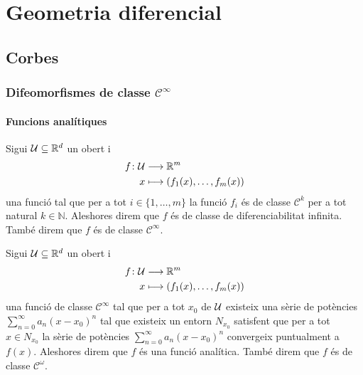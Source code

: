 \documentclass[../Apunts.tex]{subfiles}
\begin{document}
\part{Geometria diferencial}
\chapter{Corbes}
	\section{Difeomorfismes de classe \ensuremath{\mathcal{C}^{\infty}}}
	\subsection{Funcions analítiques}
	\begin{definition}
		\label{def:classe de diferenciabilitat infinita}
		Sigui \(\mathcal{U}\subseteq\mathbb{R}^{d}\) un obert i
		\begin{align*}
			f\colon\mathcal{U}&\longrightarrow\mathbb{R}^{m} \\
			x&\longmapsto(f_{1}(x),\dots,f_{m}(x))
		\end{align*}
		una funció tal que per a tot \(i\in\{1,\dots,m\}\) la funció \(f_{i}\) és de classe \(\mathcal{C}^{k}\) per a tot natural \(k\in\mathbb{N}\). Aleshores direm que \(f\) és de classe de diferenciabilitat infinita. També direm que \(f\) és de classe \(\mathcal{C}^{\infty}\).
	\end{definition}
	\begin{definition}
		\label{def:funció analítica}
		Sigui \(\mathcal{U}\subseteq\mathbb{R}^{d}\) un obert i
		\begin{align*}
			f\colon\mathcal{U}&\longrightarrow\mathbb{R}^{m} \\
			x&\longmapsto(f_{1}(x),\dots,f_{m}(x))
		\end{align*}
		una funció de classe \(\mathcal{C}^{\infty}\) tal que per a tot \(x_{0}\) de \(\mathcal{U}\) existeix una sèrie de potències \(\sum_{n=0}^{\infty}a_{n}(x-x_{0})^{n}\) tal que existeix un entorn \(N_{x_{0}}\) satisfent que per a tot \(x\in N_{x_{0}}\) la sèrie de potències \(\sum_{n=0}^{\infty}a_{n}(x-x_{0})^{n}\) convergeix puntualment a \(f(x)\). Aleshores direm que \(f\) és una funció analítica. També direm que \(f\) és de classe \(\mathcal{C}^{\omega}\).
	\end{definition}
\end{document}
